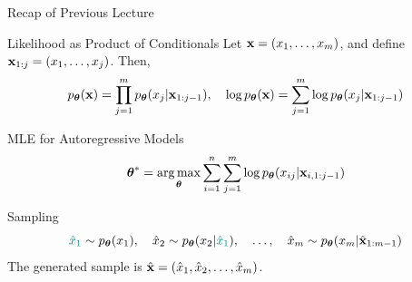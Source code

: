 \documentclass{beamer}
\begin{document}
\begin{frame}{Recap of Previous Lecture}
	\begin{block}{Likelihood as Product of Conditionals}
		Let $\mathbf{x} = (x_1, \dots, x_m)$, and define $\mathbf{x}_{1:j} = (x_1, \dots, x_j)$. Then,
		\[
		p_{\boldsymbol{\theta}}(\mathbf{x}) = \prod_{j=1}^m p_{\boldsymbol{\theta}}(x_j | \mathbf{x}_{1:j-1}), \quad 
		\log p_{\boldsymbol{\theta}}(\mathbf{x}) = \sum_{j=1}^m \log p_{\boldsymbol{\theta}}(x_j | \mathbf{x}_{1:j-1})
		\]
	\end{block}
	\vspace{-0.3cm}
	\begin{block}{MLE for Autoregressive Models}
		\vspace{-0.3cm}
		\[
		\boldsymbol{\theta}^* = \operatorname*{arg\,max}_{\boldsymbol{\theta}} \sum_{i=1}^n \sum_{j=1}^m \log p_{\boldsymbol{\theta}}(x_{ij} | \mathbf{x}_{i, 1:j-1})
		\]
		\vspace{-0.5cm}
	\end{block}
	\begin{block}{Sampling}
		\vspace{-0.5cm}
		\[
		{\color{teal} \hat{x}_1} \sim p_{\boldsymbol{\theta}}(x_1), \quad \hat{x}_2 \sim p_{\boldsymbol{\theta}}(x_2 | {\color{teal} \hat{x}_1}), \quad \ldots, \quad \hat{x}_m \sim p_{\boldsymbol{\theta}}(x_m | \hat{\mathbf{x}}_{1:m-1})
		\]
		The generated sample is $\hat{\mathbf{x}} = (\hat{x}_1, \hat{x}_2, \dots, \hat{x}_m)$.
	\end{block}
\end{frame}
\end{document}
